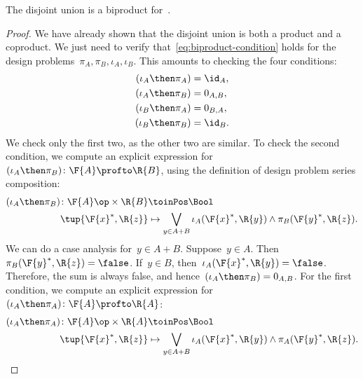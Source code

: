 \begin{lemma}
    The disjoint union is a biproduct for~\DP.
\end{lemma}
\begin{proof}
    We have already shown that the disjoint union is both
    a product and a coproduct. We just need to verify that~\cref{eq:biproduct-condition} holds
    for the design problems~$\pi_A, \pi_B, \iota_A, \iota_B$.
    This amounts to checking the four conditions:
    \begin{equation}
        \begin{aligned}
        (\iota_A\then \pi_A)
            &= \id_{A}, \\
            (\iota_A\then \pi_B) &= 0_{A,B}, \\
            (\iota_B\then \pi_A) &= 0_{B,A},\\
            (\iota_B\then \pi_B) &= \id_{B}.
        \end{aligned}
    \end{equation}
    We check only the first two, as the other two are similar.
    To check the second condition, we compute an explicit expression for~$(\iota_A\then \pi_B)\colon \F{A} \profto \R{B}$, using the definition
    of design problem series composition:
    \begin{equation}
        \begin{aligned}
        (\iota_A\then \pi_B)
            \colon  \F{A}\op\times \R{B} & \toinPos \Bool \\
            \tup{\F{x}^*, \R{z}} &\mapsto
            \bigvee_{y \in A + B} \iota_A(\F{x}^*,\R{y}) \wedge \pi_B(\F{y}^*,\R{z}).
        \end{aligned}
    \end{equation}
    We can do a case analysis for~$y\in A+B$. Suppose~$y\in A$.
    Then~$\pi_B(\F{y}^*,\R{z}) = \false$. If~$y \in B$, then~$\iota_A(\F{x}^*,\R{y}) = \false$.
    Therefore, the sum is always false, and hence~$(\iota_A\then \pi_B) = 0_{A,B}$.
    For the first condition, we compute an explicit expression for~$(\iota_A\then \pi_A) \colon \F{A} \profto \R{A}$:
    \begin{equation}
        \begin{aligned}
        (\iota_A\then \pi_A)
            \colon  \F{A}\op\times \R{A} & \toinPos \Bool \\
            \tup{\F{x}^*, \R{z}} &\mapsto
            \bigvee_{y \in A + B} \iota_A(\F{x}^*,\R{y}) \wedge \pi_A(\F{y}^*,\R{z}).
        \end{aligned}
    \end{equation}

\end{proof}
